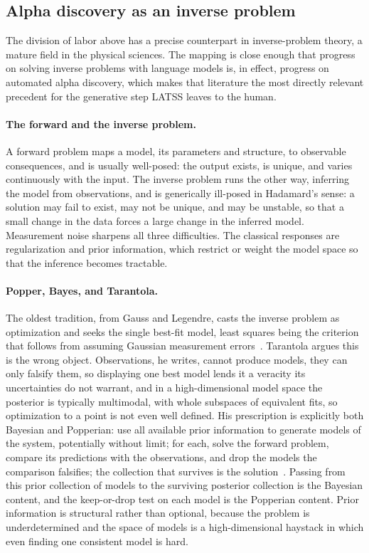 \documentclass[11pt]{article}
\begin{document}
\subsection{Alpha discovery as an inverse problem}
\label{sec:inverse}

The division of labor above has a precise counterpart in inverse-problem theory, a mature field in the
physical sciences. The mapping is close enough that progress on solving inverse problems with language
models is, in effect, progress on automated alpha discovery, which makes that literature the most
directly relevant precedent for the generative step LATSS leaves to the human.

\paragraph{The forward and the inverse problem.} A forward problem maps a model, its parameters and
structure, to observable consequences, and is usually well-posed: the output exists, is unique, and
varies continuously with the input. The inverse problem runs the other way, inferring the model from
observations, and is generically ill-posed in Hadamard's sense: a solution may fail to exist, may not be
unique, and may be unstable, so that a small change in the data forces a large change in the inferred
model. Measurement noise sharpens all three difficulties. The classical responses are regularization and
prior information, which restrict or weight the model space so that the inference becomes tractable.

\paragraph{Popper, Bayes, and Tarantola.} The oldest tradition, from Gauss and Legendre, casts the
inverse problem as optimization and seeks the single best-fit model, least squares being the criterion
that follows from assuming Gaussian measurement errors~\cite{tarantola_np}. Tarantola argues this is the
wrong object. Observations, he writes, cannot produce models, they can only falsify them, so displaying
one best model lends it a veracity its uncertainties do not warrant, and in a high-dimensional model
space the posterior is typically multimodal, with whole subspaces of equivalent fits, so optimization to
a point is not even well defined. His prescription is explicitly both Bayesian and Popperian: use all
available prior information to generate models of the system, potentially without limit; for each, solve
the forward problem, compare its predictions with the observations, and drop the models the comparison
falsifies; the collection that survives is the solution~\cite{tarantola_np,tarantola_book}. Passing from
this prior collection of models to the surviving posterior collection is the Bayesian content, and the
keep-or-drop test on each model is the Popperian content. Prior information is structural rather than
optional, because the problem is underdetermined and the space of models is a high-dimensional haystack
in which even finding one consistent model is hard.
\end{document}
